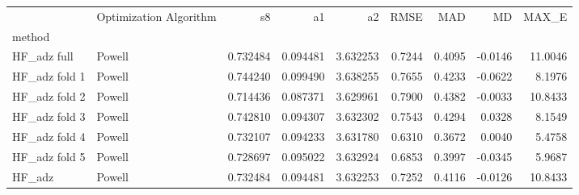 \begin{tabular}{llrrrrrrr}
 & Optimization Algorithm & s8 & a1 & a2 & RMSE & MAD & MD & MAX_E \\
method &  &  &  &  &  &  &  &  \\
HF_adz full & Powell & 0.732484 & 0.094481 & 3.632253 & 0.7244 & 0.4095 & -0.0146 & 11.0046 \\
HF_adz fold 1 & Powell & 0.744240 & 0.099490 & 3.638255 & 0.7655 & 0.4233 & -0.0622 & 8.1976 \\
HF_adz fold 2 & Powell & 0.714436 & 0.087371 & 3.629961 & 0.7900 & 0.4382 & -0.0033 & 10.8433 \\
HF_adz fold 3 & Powell & 0.742810 & 0.094307 & 3.632302 & 0.7543 & 0.4294 & 0.0328 & 8.1549 \\
HF_adz fold 4 & Powell & 0.732107 & 0.094233 & 3.631780 & 0.6310 & 0.3672 & 0.0040 & 5.4758 \\
HF_adz fold 5 & Powell & 0.728697 & 0.095022 & 3.632924 & 0.6853 & 0.3997 & -0.0345 & 5.9687 \\
HF_adz & Powell & 0.732484 & 0.094481 & 3.632253 & 0.7252 & 0.4116 & -0.0126 & 10.8433 \\
\end{tabular}

